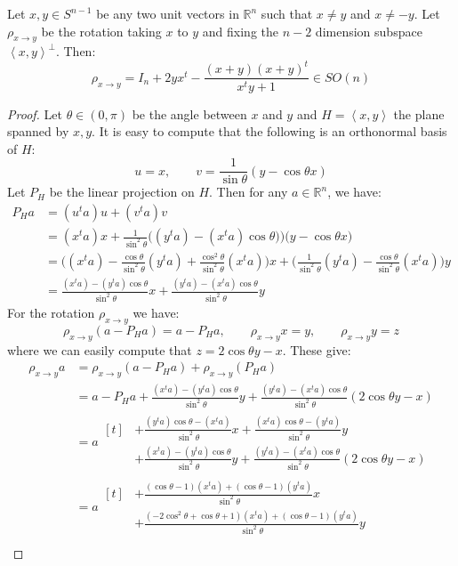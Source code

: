\begin{computation}\label{com:rotation} Let $x,y\in S^{n-1}$ be any two unit vectors in $\mathbb{R}^n$ such that $x\neq y$ and $x\neq -y$. Let $\rho_{x\to y}$ be the rotation taking $x$ to $y$ and fixing the $n-2$ dimension subspace $\left<x,y\right>^{\perp}$. Then:
\[\rho_{x\to y}=I_n+2yx^t-\frac{(x+y)(x+y)^t}{x^ty+1}\in SO(n)\]
\end{computation}
\begin{proof} Let $\theta\in(0,\pi)$ be the angle between $x$ and $y$ and $H=\left<x,y\right>$ the plane spanned by $x,y$. It is easy to compute that the following is an orthonormal basis of $H$:
\[u=x,\qquad v=\frac{1}{\sin\theta}(y-\cos\theta x)\]
Let $P_H$ be the linear projection on $H$. Then for any $a\in\mathbb{R}^n$, we have:
\begin{align*}
P_Ha&=(u^ta)u+(v^ta)v\\
&=(x^ta)x+\frac{1}{\sin^2\theta}\big((y^ta)-(x^ta)\cos\theta)\big)\big(y-\cos\theta x\big)\\
&=\Big((x^ta)-\frac{\cos\theta}{\sin^2\theta}(y^ta)+\frac{\cos^2\theta}{\sin^2\theta}(x^ta)\Big)x+\Big(\frac{1}{\sin^2\theta}(y^ta)-\frac{\cos\theta}{\sin^2\theta}(x^ta)\Big)y\\
&=\frac{(x^ta)-(y^ta)\cos\theta}{\sin^2\theta}x+\frac{(y^ta)-(x^ta)\cos\theta}{\sin^2\theta}y
\end{align*}
For the rotation $\rho_{x\to y}$ we have:
\[\rho_{x\to y}(a-P_Ha)=a-P_Ha,\qquad\rho_{x\to y}x=y,\qquad\rho_{x\to y}y=z\]
where we can easily compute that $z=2\cos\theta y-x$. These give:
\begingroup
\allowdisplaybreaks
\begin{align*}
\rho_{x\to y}a&=\rho_{x\to y}(a-P_Ha)+\rho_{x\to y}(P_Ha)\\
&=a-P_Ha+\frac{(x^ta)-(y^ta)\cos\theta}{\sin^2\theta}y+\frac{(y^ta)-(x^ta)\cos\theta}{\sin^2\theta}(2\cos\theta y-x)\\
&=a\begin{aligned}[t]&+\frac{(y^ta)\cos\theta-(x^ta)}{\sin^2\theta}x+\frac{(x^ta)\cos\theta-(y^ta)}{\sin^2\theta}y\\
&+\frac{(x^ta)-(y^ta)\cos\theta}{\sin^2\theta}y+\frac{(y^ta)-(x^ta)\cos\theta}{\sin^2\theta}(2\cos\theta y-x)\end{aligned}\\
&=a\begin{aligned}[t]&+\frac{(\cos\theta-1)(x^ta)+(\cos\theta-1)(y^ta)}{\sin^2\theta}x\\
&+\frac{(-2\cos^2\theta+\cos\theta+1)(x^ta)+(\cos\theta-1)(y^ta)}{\sin^2\theta}y\end{aligned}\\

\end{align*}
\end{proof}
